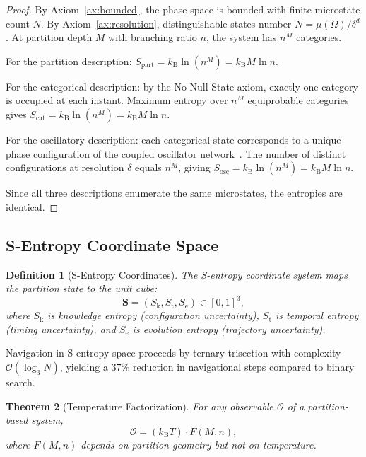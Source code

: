 \documentclass[twocolumn,10pt]{article}
\newtheorem{theorem}{Theorem}[section]
\newtheorem{definition}[theorem]{Definition}
\theoremstyle{remark}
\newcommand{\Sk}{S_{\mathrm{k}}}
\newcommand{\St}{S_{\mathrm{t}}}
\newcommand{\Se}{S_{\mathrm{e}}}
\newcommand{\Sosc}{S_{\mathrm{osc}}}
\newcommand{\Scat}{S_{\mathrm{cat}}}
\newcommand{\Spart}{S_{\mathrm{part}}}
\newcommand{\kB}{k_{\mathrm{B}}}
\begin{document}
\begin{proof}
By Axiom~\ref{ax:bounded}, the phase space is bounded with finite microstate count $N$. By Axiom~\ref{ax:resolution}, distinguishable states number $N = \mu(\Omega)/\delta^d$. At partition depth $M$ with branching ratio $n$, the system has $n^M$ categories.

For the partition description: $\Spart = \kB \ln(n^M) = \kB M \ln n$.

For the categorical description: by the No Null State axiom, exactly one category is occupied at each instant. Maximum entropy over $n^M$ equiprobable categories gives $\Scat = \kB \ln(n^M) = \kB M \ln n$.

For the oscillatory description: each categorical state corresponds to a unique phase configuration of the coupled oscillator network~\citep{kuramoto1984chemical}. The number of distinct configurations at resolution $\delta$ equals $n^M$, giving $\Sosc = \kB \ln(n^M) = \kB M \ln n$.

Since all three descriptions enumerate the same microstates, the entropies are identical.
\end{proof}

\subsection{S-Entropy Coordinate Space}

\begin{definition}[S-Entropy Coordinates]
\label{def:sentropy}
The S-entropy coordinate system maps the partition state to the unit cube:
\begin{equation}
  \mathbf{S} = (\Sk, \St, \Se) \in [0, 1]^3,
\end{equation}
where $\Sk$ is knowledge entropy (configuration uncertainty), $\St$ is temporal entropy (timing uncertainty), and $\Se$ is evolution entropy (trajectory uncertainty).
\end{definition}

Navigation in S-entropy space proceeds by ternary trisection with complexity $\mathcal{O}(\log_3 N)$, yielding a $37\%$ reduction in navigational steps compared to binary search.

\begin{theorem}[Temperature Factorization]
\label{thm:temp}
For any observable $\mathcal{O}$ of a partition-based system,
\begin{equation}
  \mathcal{O} = (\kB T) \cdot F(M, n),
\end{equation}
where $F(M, n)$ depends on partition geometry but not on temperature.
\end{theorem}
\end{document}
